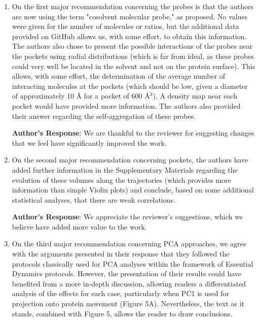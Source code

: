 \documentclass[11pt, a4paper]{article}
\begin{document}
\begin{enumerate}

    \item On the first major recommendation concerning the probes is that the authors are now using the term "cosolvent molecular probe," as proposed. No values were given for the number of molecules or ratios, but the additional data provided on GitHub allows us, with some effort, to obtain this information. The authors also chose to present the possible interactions of the probes near the pockets using radial distributions (which is far from ideal, as these probes could very well be located in the solvent and not on the protein surface). This allows, with some effort, the determination of the average number of interacting molecules at the pockets (which should be low, given a diameter of approximately 10 \r{A} for a pocket of 600 \r{A}$^3$). A density map near each pocket would have provided more information. The authors also provided their answer regarding the self-aggregation of these probes.
    
    \textbf{Author's Response}: We are thankful to the reviewer for suggesting changes that we feel have significantly improved the work. 
    
    \item On the second major recommendation concerning pockets, the authors have added further information in the Supplementary Materials regarding the evolution of these volumes along the trajectories (which provides more information than simple Violin plots) and conclude, based on some additional statistical analyses, that there are weak correlations.
    
    \textbf{Author's Response}: We appreciate the reviewer's suggestions, which we believe have added more value to the work. 



    \item On the third major recommendation concerning PCA approaches, we agree with the arguments presented in their response that they followed the protocols classically used for PCA analyses within the framework of Essential Dynamics protocols. However, the presentation of their results could have benefited from a more in-depth discussion, allowing readers a differentiated analysis of the effects for each case, particularly when PC1 is used for projection onto protein movement (Figure 5A). Nevertheless, the text as it stands, combined with Figure 5, allows the reader to draw conclusions.
    

\end{enumerate}
\end{document}
